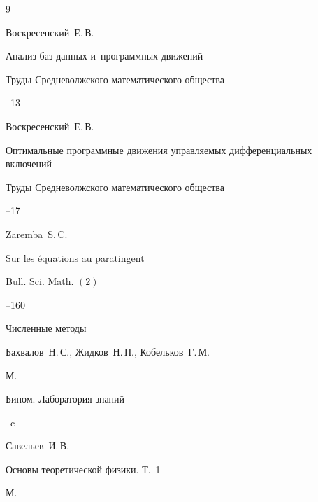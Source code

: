 \begin{thebibliography}{9}




\by Воскресенский~Е.\,В.

\paper Анализ баз данных и~программных движений

\jour Труды Средневолжского математического общества




–13




\by Воскресенский~Е.\,В.

\paper Оптимальные программные движения управляемых дифференциальных включений

\jour Труды Средневолжского математического общества




–17




\by Zaremba~S.\,C.

\paper Sur les \'{e}quations au paratingent

\jour Bull. Sci. Math. $(2)$




–160




\book Численные методы

\by Бахвалов~Н.\,С., Жидков~Н.\,П., Кобельков~Г.\,М.

\publaddr М.

\publ Бином. Лаборатория знаний


~c




\by Савельев~И.\,В.

\book Основы теоретической физики. Т.~1

\publaddr М.


\end{thebibliography}
